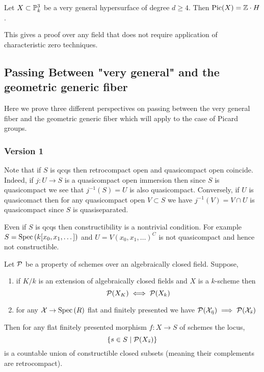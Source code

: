 \documentclass[12pt]{article}
\begin{document}
\begin{cor}
Let $X \subset \P^3_k$ be a very general hypersurface of degree $d \ge 4$. Then $\Pic{X} = \Z \cdot H$.
\end{cor}

\begin{rmk}
This gives a proof over any field that does not require application of characteristic zero techniques. 
\end{rmk}

\subsection{Passing Between "very general" and the geometric generic fiber}

Here we prove three different perspectives on passing between the very general fiber and the geometric generic fiber which will apply to the case of Picard groups.

\newcommand{\cX}{\mathcal{X}}
\renewcommand{\I}{\mathcal{I}}

\subsubsection{Version 1}


\begin{rmk}
Note that if $S$ is qcqs then retrocompact open and quasicompact open coincide. Indeed, if $j : U \to S$ is a quasicompact open immersion then since $S$ is quasicompact we see that $j^{-1}(S) = U$ is also quasicompact. Conversely, if $U$ is quasicomact then for any quasicompact open $V \subset S$ we have $j^{-1}(V) = V \cap U$ is quasicompact since $S$ is quasiseparated.  
\end{rmk}

\begin{rmk}
Even if $S$ is qcqs then constructibility is a nontrivial condition. For example $S = \Spec{k[x_0, x_1, \dots]}$ and $U = V(x_0, x_1, \dots)^C$ is not quasicompact and hence not constructible.
\end{rmk}

\begin{prop}
Let $\cP$ be a property of schemes over an algebraically closed field. Suppose,
\begin{enumerate}
\item if $K/k$ is an extension of algebraically closed fields and $X$ is a $k$-scheme then 
\[ \cP(X_K) \iff \cP(X_k) \]
\item for any $\cX \to \Spec{R}$ flat and finitely presented we have $\cP(\cX_{\bar{\eta}}) \implies \cP(\cX_{\bar{s}})$
\end{enumerate}
Then for any flat finitely presented morphism $f : X \to S$ of schemes the locus,
\[ \{ s \in S \mid \cP(X_{\bar{s}}) \} \]
is a countable union of constructible closed subsets (meaning their complements are retrocompact). 
\end{prop}
\end{document}
